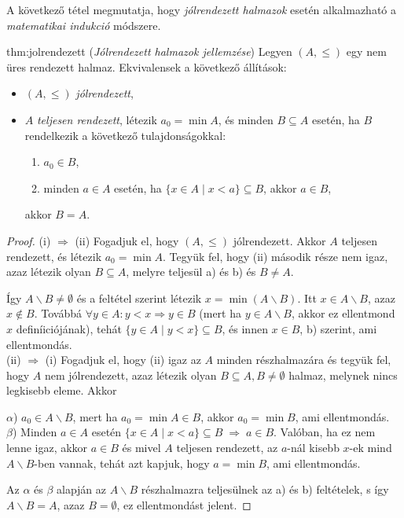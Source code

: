 A következő tétel megmutatja, hogy \emph{jólrendezett halmazok} esetén
alkalmazható a \emph{matematikai indukció} módszere.
\begin{theorem}{thm:jolrendezett} (\emph{Jólrendezett halmazok jellemzése})
Legyen $(A,\leq)$ egy nem üres rendezett halmaz. Ekvivalensek a következő
állítások: 
\begin{itemize}
\item[(i)] $(A,\leq)$ \emph{jólrendezett}, 
\item[(ii)] $A$ \emph{teljesen rendezett}, létezik $a_{0}=\min A$, és minden
$B\subseteq A$ esetén, ha $B$ rendelkezik a következő tulajdonságokkal: 
\begin{enumerate}
\item $a_{0}\in B$, 
\item minden $a\in A$ esetén, ha $\{x\in A\mid x<a\}\subseteq B$, akkor
$a\in B$, 
\end{enumerate}
akkor $B=A$. 

\end{itemize}
\end{theorem}
\begin{proof}
(i) $\Rightarrow$ (ii) Fogadjuk el, hogy
$(A,\leq)$ jólrendezett. Akkor $A$ teljesen rendezett, és létezik
$a_{0}=\min A$. Tegyük fel, hogy (ii) második része nem igaz, azaz
létezik olyan $B\subseteq A$, melyre teljesül a) és b) és $B\neq A$.

Így $A\backslash B\neq\emptyset$ és a feltétel szerint létezik $x=\min(A\backslash B)$.
Itt $x\in A\backslash B$, azaz $x\notin B$. Továbbá $\forall y\in A:y<x\Rightarrow y\in B$
(mert ha $y\in A\backslash B$, akkor ez ellentmond $x$ definíiciójának),
tehát $\{y\in A\mid y<x\}\subseteq B$, és innen $x\in B$, b) szerint,
ami ellentmondás.\\[4pt] (ii) $\Rightarrow$ (i) Fogadjuk el, hogy
(ii) igaz az $A$ minden részhalmazára és tegyük fel, hogy $A$ nem
jólrendezett, azaz létezik olyan $B\subseteq A,B\neq\emptyset$ halmaz,
melynek nincs legkisebb eleme. Akkor

\noindent$\alpha$) $a_{0}\in A\backslash B$, mert ha $a_{0}=\min A\in B$,
akkor $a_{0}=\min B$, ami ellentmondás.\\
 $\beta$) Minden $a\in A$ esetén $\{x\in A\mid x<a\}\subseteq B\;\Rightarrow\;a\in B$.
Valóban, ha ez nem lenne igaz, akkor $a\in B$ és mivel $A$ teljesen
rendezett, az $a$-nál kisebb $x$-ek mind $A\backslash B$-ben vannak,
tehát azt kapjuk, hogy $a=\min B$, ami ellentmondás.

Az $\alpha$ és $\beta$ alapján az $A\backslash B$ részhalmazra
teljesülnek az a) és b) feltételek, s így $A\backslash B=A$, azaz
$B=\emptyset$, ez ellentmondást jelent. 
\end{proof}

